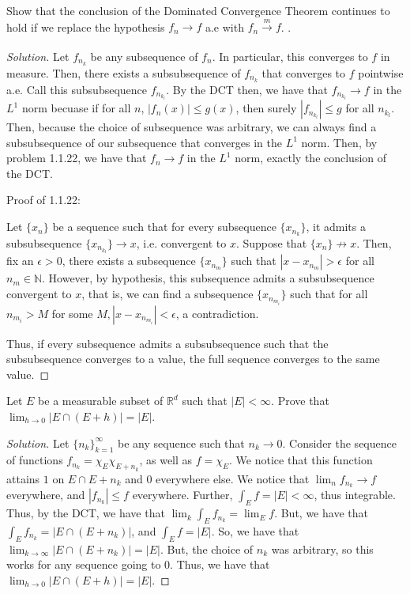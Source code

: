 \documentclass[10pt]{article}
\newenvironment{problem}[2][Problem]{\begin{trivlist}
\item[\hskip \labelsep {\bfseries #1}\hskip \labelsep {\bfseries #2.}]}{\end{trivlist}}
\begin{document}
\begin{problem}{4.5.22}

Show that the conclusion of the Dominated Convergence Theorem continues to hold if we replace the hypothesis $f_n \to f$ a.e with $f_n \xrightarrow[]{m} f$.
.
\end{problem}
\begin{proof}[Solution]

Let $f_{n_k}$ be any subsequence of $f_n$. In particular, this converges to $f$ in measure. Then, there exists a subsubsequence of $f_{n_k}$ that converges to $f$ pointwise a.e. Call this subsubsequence $f_{n_{k_l}}$. By the DCT then, we have that $f_{n_{k_l}} \to f$ in the $L^1$ norm becuase if for all $n$, $|f_n(x)| \leq g(x)$, then surely $|f_{n_{k_l}}| \leq g$ for all $n_{k_l}$. Then, because the choice of subsequence was arbitrary, we can always find a subsubsequence of our subsequence that converges in the $L^1$ norm. Then, by problem 1.1.22, we have that $f_n \to f$ in the $L^1$ norm, exactly the conclusion of the DCT.

Proof of 1.1.22:

Let $\{ x_n \}$ be a sequence such that for every subsequence $\{ x_{n_k} \}$, it admits a subsubsequence $\{ x_{n_{k_l}} \} \to x$, i.e. convergent to $x$. Suppose that $\{ x_n \} \not \to x$. Then, fix an $\epsilon > 0$, there exists a subsequence $\{ x_{n_m} \}$ such that $|x - x_{n_m}| > \epsilon$ for all $n_m \in \mathbb{N}$. However, by hypothesis, this subsequence admits a subsubsequence convergent to $x$, that is, we can find a subsequence $\{ x_{n_{m_i}} \}$ such that for all $n_{m_i} > M$ for some $M, |x  -  x_{n_{m_i}}| < \epsilon$, a contradiction.

Thus, if every subsequence admits a subsubsequence such that the subsubsequence converges to a value, the full sequence converges to the same value.
\end{proof}

\begin{problem}{4.5.26}

Let $E$ be a measurable subset of $\mathbb{R}^d$ such that $|E| < \infty$. Prove that $\lim_{h \to 0} |E \cap (E + h)| = |E|$.

\end{problem}

\begin{proof}[Solution]

Let $\{ n_k \}_{k=1}^\infty$ be any sequence such that $n_k \to 0$. Consider the sequence of functions $f_{n_k} = \chi_E \chi_{E + n_k}$, as well as $f = \chi_E$. We notice that this function attains $1$ on $E \cap E + n_k$ and $0$ everywhere else. We notice that $\lim_n f_{n_k} \to f$ everywhere, and $|f_{n_k}| \leq f$ everywhere. Further, $\int_E f =|E| < \infty$, thus integrable. Thus, by the DCT, we have that $\lim_k \int_E f_{n_k} = \lim_E f$. But, we have that  $\int_E f_{n_k} =  |E \cap (E + n_k)| $, and $\int_E f = |E|$. So, we have that $\lim_{k \to \infty}  |E \cap (E + n_k)| = |E|$. But, the choice of $n_k$ was arbitrary, so this works for any sequence going to $0$. Thus, we have that $\lim_{h \to 0} |E \cap (E + h)| = |E|$.

\end{proof}
\end{document}

